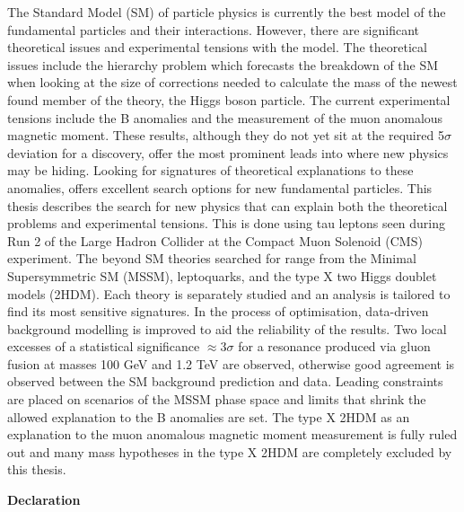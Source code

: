 \begin{titlepage}
\begin{adjustwidth}{1cm}{1cm}
The Standard Model (SM) of particle physics is currently the best model of the fundamental particles and their interactions. 
However, there are significant theoretical issues and experimental tensions with the model. 
The theoretical issues include the hierarchy problem which forecasts the breakdown of the SM when looking at the size of corrections needed to calculate the mass of the newest found member of the theory, the Higgs boson particle. 
The current experimental tensions include the B anomalies and the measurement of the muon anomalous magnetic moment. 
These results, although they do not yet sit at the required 5$\sigma$ deviation for a discovery, offer the most prominent leads into where new physics may be hiding. 
Looking for signatures of theoretical explanations to these anomalies, offers excellent search options for new fundamental particles. 
This thesis describes the search for new physics that can explain both the theoretical problems and experimental tensions. 
This is done using tau leptons seen during Run 2 of the Large Hadron Collider at the Compact Muon Solenoid (CMS) experiment. 
The beyond SM theories searched for range from the Minimal Supersymmetric SM (MSSM), leptoquarks, and the type X two Higgs doublet models (2HDM). 
Each theory is separately studied and an analysis is tailored to find its most sensitive signatures. 
In the process of optimisation, data-driven background modelling is improved to aid the reliability of the results. 
Two local excesses of a statistical significance $\approx 3\sigma$ for a resonance produced via gluon fusion at masses 100 GeV and 1.2 TeV are observed, otherwise good agreement is observed between the SM background prediction and data.
Leading constraints are placed on scenarios of the MSSM phase space and limits that shrink the allowed explanation to the B anomalies are set.
The type X 2HDM as an explanation to the muon anomalous magnetic moment measurement is fully ruled out and many mass hypotheses in the type X 2HDM are completely excluded by this thesis.
\end{adjustwidth}
\vspace*{\fill}
\newpage

\vspace*{\fill}
\begin{adjustwidth}{1cm}{1cm}
\begin{center}
\Large \textbf{Declaration}
\vspace{0.5cm}
\end{center}


\end{adjustwidth}
\end{titlepage}
